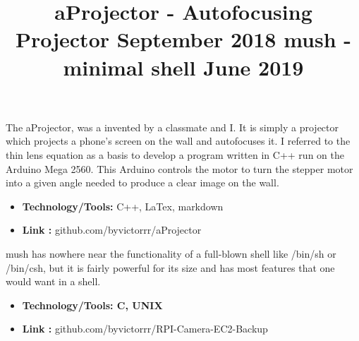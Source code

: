 \documentclass[margin]{res}
\begin{document}
\begin{resume}
{%
\location{}
\title{\textbf{aProjector - Autofocusing Projector \hfill September 2018}}
\begin{position}
 The aProjector, was a invented by a classmate and I. It is simply a projector which projects a phone’s screen on the wall and autofocuses it. I referred to the thin lens equation as a basis to develop a program written in C++ run on the Arduino Mega 2560. This Arduino controls the motor to turn the stepper motor into a given angle needed to produce a clear image on the wall.
\begin{itemize}
\item \textbf{Technology/Tools:} C++, LaTex, markdown
\end{itemize}
\begin{itemize}
\item \textbf{Link :} github.com/byvictorrr/aProjector
\end{itemize}
\end{position}




\location{}
\title{\textbf{ mush - minimal shell  \hfill June 2019}}
\begin{position}
mush has nowhere near the functionality of a full-blown shell like /bin/sh or /bin/csh, but it is fairly powerful for its size and has most features that one would want in a shell.
\begin{itemize}
\item \textbf{Technology/Tools: C, UNIX}
\end{itemize}
\begin{itemize}
\item \textbf{Link :} github.com/byvictorrr/RPI-Camera-EC2-Backup
\end{itemize}
\end{position}



}
\end{resume}
\end{document}

